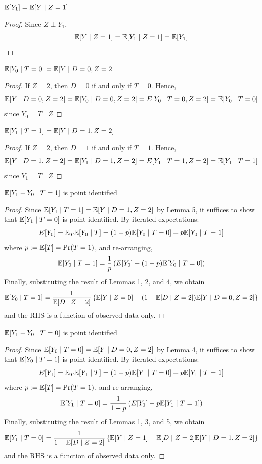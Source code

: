 \documentclass[oneside,11pt]{article}
\begin{document}
\begin{lem}
$\mathbb{E}[Y_1] = \mathbb{E}[Y\;|\;Z=1]$
\end{lem}
\begin{proof}
Since $Z\perp Y_1$, 
\begin{align*}
\mathbb{E}[Y\;|\;Z=1] =\mathbb{E}[Y_1\;|\;Z=1] = \mathbb{E}[Y_1]
\end{align*}
\end{proof}


\begin{lem}
$\mathbb{E}[Y_0\;|\;T=0] = \mathbb{E}[Y\;|\; D=0,Z=2]$
\end{lem}
\begin{proof}
If $Z=2$, then $D=0$ if and only if $T=0$. Hence,
\[\mathbb{E}[Y\;|\;D=0, Z=2] = \mathbb{E}[Y_0\;|\;D=0, Z=2] = E[Y_0\;|\;T=0, Z=2]=\mathbb{E}[Y_0\;|\;T=0]\]
since $Y_0\perp T\;|\;Z$
\end{proof}

\begin{lem}
$\mathbb{E}[Y_1\;|\;T=1] = \mathbb{E}[Y\;|\; D=1,Z=2]$
\end{lem}
\begin{proof}
If $Z=2$, then $D=1$ if and only if $T=1$. Hence,
\[\mathbb{E}[Y\;|\;D=1, Z=2] = \mathbb{E}[Y_1\;|\;D=1, Z=2] = E[Y_1\;|\;T=1, Z=2]=\mathbb{E}[Y_1\;|\;T=1]\]
since $Y_1\perp T\;|\;Z$
\end{proof}

\begin{theorem} $\mathbb{E}[Y_1-Y_0\;|\; T=1]$ is point identified
\end{theorem}

\begin{proof}
Since $\mathbb{E}[Y_1\;|\; T=1] = \mathbb{E}[Y\;|\; D=1, Z=2]$ by Lemma 5, it suffices to show that $\mathbb{E}[Y_1\;|\;T=0]$ is point identified. By iterated expectations:
\[E[Y_0] = \mathbb{E}_T\mathbb{E}[Y_0\;|\;T] = (1-p)\mathbb{E}[Y_0\;|\;T=0]+p\mathbb{E}[Y_0\;|\;T=1]\]
where $p:=\mathbb{E}[T]=\Pr(T=1)$, and re-arranging,
\[\mathbb{E}[Y_0\;|\;T=1] = \frac{1}{p}\left(E[Y_0] -(1-p)\mathbb{E}[Y_0\;|\;T=0]\right)\]
Finally, substituting the result of Lemmas 1, 2, and 4, we obtain
\[\mathbb{E}[Y_0\;|\;T=1] =\frac{1}{\mathbb{E}[D\;|\;Z=2]}\left\{\mathbb{E}[Y\;|\;Z=0]-(1-\mathbb{E}[D\;|\;Z=2])\mathbb{E}[Y\;|\;D=0, Z=2]\right\}\]
and the RHS is a function of observed data only.
\end{proof}

\begin{theorem} $\mathbb{E}[Y_1-Y_0\;|\; T=0]$ is point identified
\end{theorem}

\begin{proof}
Since $\mathbb{E}[Y_0\;|\; T=0] = \mathbb{E}[Y\;|\; D=0, Z=2]$ by Lemma 4, it suffices to show that $\mathbb{E}[Y_0\;|\;T=1]$ is point identified. By iterated expectations:
\[E[Y_1] = \mathbb{E}_T\mathbb{E}[Y_1\;|\;T] = (1-p)\mathbb{E}[Y_1\;|\;T=0]+p\mathbb{E}[Y_1\;|\;T=1]\]
where $p:=\mathbb{E}[T]=\Pr(T=1)$, and re-arranging,
\[\mathbb{E}[Y_1\;|\;T=0] = \frac{1}{1-p}\left(E[Y_1] -p\mathbb{E}[Y_1\;|\;T=1]\right)\]
Finally, substituting the result of Lemmas 1, 3, and 5, we obtain
\[\mathbb{E}[Y_1\;|\;T=0] =\frac{1}{1-\mathbb{E}[D\;|\;Z=2]}\left\{\mathbb{E}[Y\;|\;Z=1]-\mathbb{E}[D\;|\;Z=2]\mathbb{E}[Y\;|\;D=1, Z=2]\right\}\]
and the RHS is a function of observed data only.
\end{proof}
\end{document}
